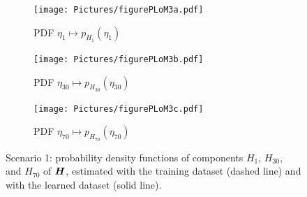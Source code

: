\begin{figure}[!htb]
    \begin{center}
        \begin{subfigure}[b]{0.32\textwidth}
            \begin{center}
                \texttt{[image: Pictures/figurePLoM3a.pdf]}
            \end{center}
                \caption{PDF $\eta_1\mapsto p_{H_1}(\eta_1)$}
                \label{fig:figurePLoM3a}
            \end{subfigure}
            \begin{subfigure}[b]{0.32\textwidth}
                \begin{center}
                    \texttt{[image: Pictures/figurePLoM3b.pdf]}
                \end{center}
                \caption{PDF $\eta_{30}\mapsto p_{H_{30}}(\eta_{30})$}
                \label{fig:figurePLoM3b}
            \end{subfigure}
            \begin{subfigure}[b]{0.32\textwidth}
                \begin{center}
                    \texttt{[image: Pictures/figurePLoM3c.pdf]}
                \end{center}    
                \caption{PDF $\eta_{70}\mapsto p_{H_{70}}(\eta_{70})$}
                \label{fig:figurePLoM3c}
            \end{subfigure}
    \end{center}
    \caption[Scenario 1: probability density functions of components $H_1$, $H_{30}$, and $H_{70}$ of $\bfH$.]{Scenario 1: probability density functions of components $H_1$, $H_{30}$, and $H_{70}$ of $\bfH$, estimated with the training dataset (dashed line) and with the learned dataset (solid line).}
    \label{fig:figurePLoM3}
\end{figure}
%
